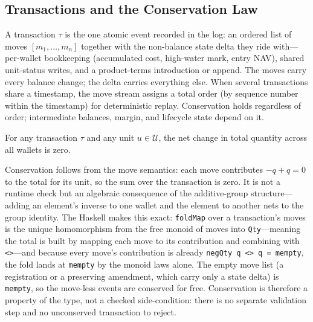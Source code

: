 \subsection{Transactions and the Conservation Law}

\begin{definition}[Transaction]
A transaction $\tau$ is the one atomic event recorded in the log: an ordered list of moves $[m_1,\ldots,m_n]$ together with the non-balance state delta they ride with---per-wallet bookkeeping (accumulated cost, high-water mark, entry NAV), shared unit-status writes, and a product-terms introduction or append. The moves carry every balance change; the delta carries everything else. When several transactions share a timestamp, the move stream assigns a total order (by sequence number within the timestamp) for deterministic replay. Conservation holds regardless of order; intermediate balances, margin, and lifecycle state depend on it.
\end{definition}

\begin{principle}
\label{cond:conservation}
For any transaction $\tau$ and any unit $u \in \mathcal{U}$, the net change in total quantity across all wallets is zero.
\end{principle}

Conservation follows from the move semantics: each move contributes $-q + q = 0$ to the total for its unit, so the sum over the transaction is zero. It is not a runtime check but an algebraic consequence of the additive-group structure---adding an element's inverse to one wallet and the element to another nets to the group identity. The Haskell makes this exact: \texttt{foldMap} over a transaction's moves is the unique homomorphism from the free monoid of moves into \texttt{Qty}---meaning the total is built by mapping each move to its contribution and combining with \texttt{<>}---and because every move's contribution is already \texttt{negQty q <> q = mempty}, the fold lands at \texttt{mempty} by the monoid laws alone. The empty move list (a registration or a preserving amendment, which carry only a state delta) is \texttt{mempty}, so the move-less events are conserved for free. Conservation is therefore a property of the type, not a checked side-condition: there is no separate validation step and no unconserved transaction to reject.

